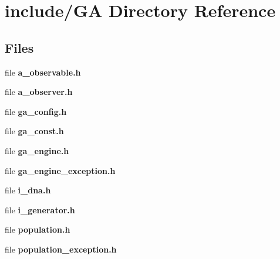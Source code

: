 \section{include/\+G\+A Directory Reference}
\label{dir_2eb5e8b0558585fa55f9b77add769972}
\subsection*{Files}
\begin{DoxyCompactItemize}
\item 
file {\bfseries a\+\_\+observable.\+h}
\item 
file {\bfseries a\+\_\+observer.\+h}
\item 
file {\bfseries ga\+\_\+config.\+h}
\item 
file {\bfseries ga\+\_\+const.\+h}
\item 
file {\bfseries ga\+\_\+engine.\+h}
\item 
file {\bfseries ga\+\_\+engine\+\_\+exception.\+h}
\item 
file {\bfseries i\+\_\+dna.\+h}
\item 
file {\bfseries i\+\_\+generator.\+h}
\item 
file {\bfseries population.\+h}
\item 
file {\bfseries population\+\_\+exception.\+h}
\end{DoxyCompactItemize}

